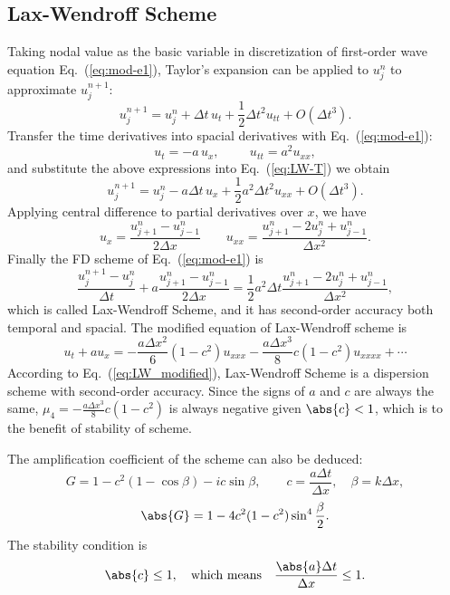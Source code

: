 \documentclass[]{article}
\begin{document}
\subsection{Lax-Wendroff Scheme}
\label{sec:lax-wendroff-scheme}
Taking nodal value as the basic variable in discretization of first-order 
wave equation Eq.~(\ref{eq:mod-e1}), Taylor's expansion can be
applied to $u_j^{n}$ to approximate $u_j^{n+1}$:
\begin{equation}
  u_j^{n+1}=u_j^n+\Delta t\,u_t +\frac{1}{2}\Delta t^2 u_{tt}+O(\Delta t^3).
  \label{eq:LW-T} 
\end{equation}
Transfer the time derivatives into spacial derivatives with
Eq.~(\ref{eq:mod-e1}):
\begin{equation*}
  u_t=-a\, u_x,\hspace{1cm} u_{tt} = a^2 u_{xx},
\end{equation*}
and substitute the above expressions into Eq.~(\ref{eq:LW-T}) we
obtain
\begin{equation}
  u_j^{n+1}=u_j^n-a\Delta t\, u_x +\frac{1}{2}a^2\Delta t^2 u_{xx}+O(\Delta t^3).
  \label{eq:LW-T1} 
\end{equation}
Applying central difference to partial derivatives over $x$, we have
\begin{equation*}
  u_x=\dfrac{u_{j+1}^n-u_{j-1}^n}{2\Delta x} \qquad
  u_{xx}=\dfrac{u_{j+1}^n-2u_j^n+u_{j-1}^n}{\Delta x^2}.
\end{equation*}
Finally the FD scheme of Eq.~(\ref{eq:mod-e1}) is
\begin{equation*}
  \label{eq:LW} \dfrac{u_{j}^{n+1}-u_{j}^n}{\Delta
    t}+a\dfrac{u_{j+1}^n-u_{j-1}^n}{2\Delta x} =\dfrac{1}{2}a^2\Delta
  t\dfrac{u_{j+1}^n-2u_j^n+u_{j-1}^n}{\Delta x^2},
\end{equation*}
which is called Lax-Wendroff Scheme, and it has second-order accuracy
both temporal and spacial. The modified equation of Lax-Wendroff
scheme is
\begin{equation}
  u_t+au_x=-\frac{a\Delta x^2}{6}(1-c^2)u_{xxx} -\frac{a\Delta x^3}{8}c(1-c^2)u_{xxxx}+\cdots
  \label{eq:LW_modified}
\end{equation}
According to Eq.~(\ref{eq:LW_modified}), Lax-Wendroff Scheme is a
dispersion scheme with second-order accuracy. Since the signs of $a$
and $c$ are always the same, $\mu_4=-\frac{a\Delta x^3}{8}c(1-c^2)$ is
always negative given $\abs{c} < 1$, which is to the benefit of
stability of scheme.

The amplification coefficient of the scheme can also be deduced:
\begin{equation}
  G=1-c^2(1-\cos\beta)-ic\sin\beta,\quad\quad
  c=\frac{a\Delta t}{\Delta x},\quad \beta=k\Delta x,
  \label{eq:LWG} 
\end{equation}
\begin{equation}
  \abs{G}=1-4c^2(1-c^2)\sin^4\frac{\beta}{2}.
  \label{eq:LWGA} 
\end{equation}
The stability condition is
\begin{equation}
  \abs{c}\leq 1,\quad\mbox{which means}\quad
  \frac{\abs{a}\Delta t}{\Delta x}\leq 1.
  \label{eq:LWGA1} 
\end{equation}
\end{document}
